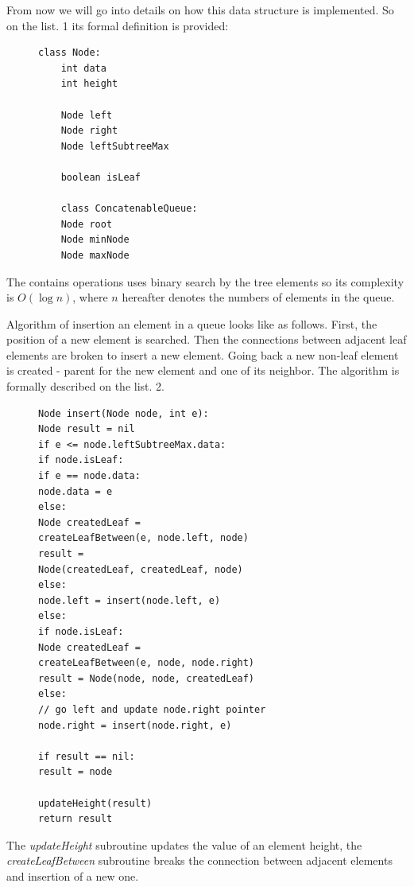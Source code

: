 \documentclass[conference]{IEEEtran}
\theoremstyle{plane}
\begin{document}
From now we will go into details on how this data structure is implemented. So on the list. 1 its formal definition is provided:

\begin{figure}[htbp]
	\begin{lstlisting}[caption={Structure of a concatenable queue vertex},captionpos=b]
	class Node:
	int data		
	int height
	
	Node left
	Node right
	Node leftSubtreeMax
	
	boolean isLeaf
	
	class ConcatenableQueue:
	Node root
	Node minNode
	Node maxNode
	\end{lstlisting}
\end{figure}

The contains operations uses binary search by the tree elements so its complexity is $O(\log n)$, where $n$ hereafter denotes the numbers of elements in the queue.

Algorithm of insertion an element in a queue looks like as follows. First, the position of a new element is searched. Then the connections between adjacent leaf elements are broken to insert a new element. Going back a new non-leaf element is created - parent for the new element and one of its neighbor. The algorithm is formally described on the list. 2.

\begin{figure}[htbp]
\begin{lstlisting}[caption={Queue element insertion algorithm},captionpos=b]
Node insert(Node node, int e):
Node result = nil
if e <= node.leftSubtreeMax.data: 
if node.isLeaf:
if e == node.data:
node.data = e
else:
Node createdLeaf = 
createLeafBetween(e, node.left, node)
result = 
Node(createdLeaf, createdLeaf, node)
else:
node.left = insert(node.left, e)
else:
if node.isLeaf: 
Node createdLeaf = 
createLeafBetween(e, node, node.right)
result = Node(node, node, createdLeaf)
else: 
// go left and update node.right pointer
node.right = insert(node.right, e)

if result == nil:
result = node

updateHeight(result)
return result
\end{lstlisting}
\end{figure}
	
The \textit{updateHeight} subroutine updates the value of an element height, the \textit{createLeafBetween} subroutine breaks the connection between adjacent elements and insertion of a new one. 
\end{document}
